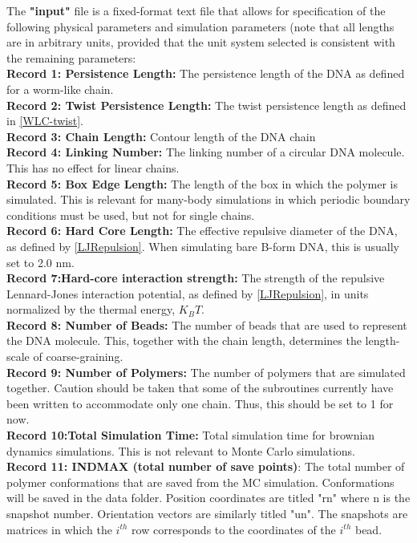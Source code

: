 \documentclass[english]{article}
\begin{document}
The \textbf{"input"} file is a fixed-format text file that allows for specification of the following physical parameters and simulation parameters (note that all lengths are in arbitrary units, provided that the unit system selected is consistent with the remaining parameters:\\
\textbf{Record 1: Persistence Length:} The persistence length of the DNA as defined for a worm-like chain.\\
\textbf{Record 2: Twist Persistence Length:} The twist persistence length as defined in \eqref{WLC-twist}.\\
\textbf{Record 3: Chain Length:} Contour length of the DNA chain\\
\textbf{Record 4: Linking Number:} The linking number of a circular DNA molecule. This has no effect for linear chains.\\
\textbf{Record 5: Box Edge Length:} The length of the box in which the polymer is simulated. This is relevant for many-body simulations in which periodic boundary conditions must be used, but not for single chains.\\
\textbf{Record 6: Hard Core Length:} The effective repulsive diameter of the DNA, as defined by \eqref{LJRepulsion}. When simulating bare B-form DNA, this is usually set to 2.0 nm.\\
\textbf{Record 7:Hard-core interaction strength:} The strength of the repulsive Lennard-Jones interaction potential, as defined by \eqref{LJRepulsion}, in units normalized by the thermal energy, $K_BT$.\\
\textbf{Record 8: Number of Beads:} The number of beads that are used to represent the DNA molecule. This, together with the chain length, determines the length-scale of coarse-graining. \\
\textbf{Record 9: Number of Polymers:} The number of polymers that are simulated together. Caution should be taken that some of the subroutines currently have been written to accommodate only one chain. Thus, this should be set to 1 for now.\\
\textbf{Record 10:Total Simulation Time:} Total simulation time for brownian dynamics simulations. This is not relevant to Monte Carlo simulations.\\
\textbf{Record 11: INDMAX (total number of save points)}: The total number of polymer conformations that are saved from the MC simulation. Conformations will be saved in the data folder. Position coordinates are titled "rn" where n is the snapshot number. Orientation vectors are similarly titled "un". The snapshots are matrices in which the $i^{th}$ row corresponds to the coordinates of the $i^{th}$ bead.\\
\end{document}
